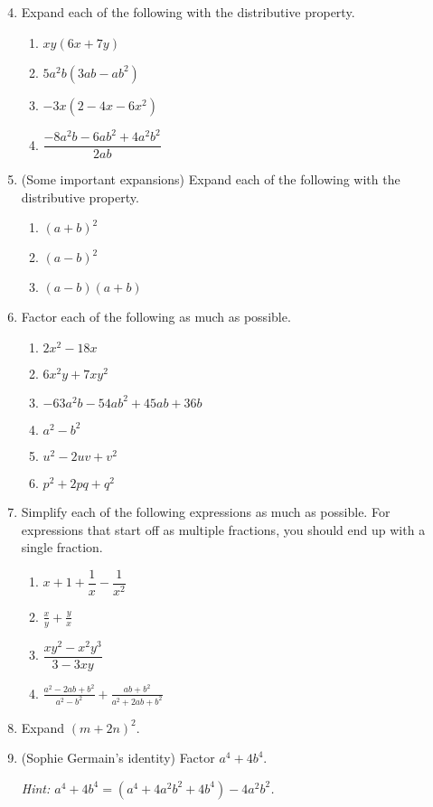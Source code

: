\documentclass{article}
\begin{document}
\begin{enumerate}
\setcounter{enumi}{3}
\item Expand each of the following with the distributive property.
\begin{enumerate}
\item $xy(6x + 7y)$
\item $5a^2b(3ab - ab^2)$
\item $-3x(2 - 4x - 6x^2)$
\item $\dfrac{-8a^2b - 6ab^2 + 4a^2b^2}{2ab}$
\end{enumerate}
\item (Some important expansions) Expand each of the following with the distributive property.
\begin{enumerate}
\item $(a + b)^2$
\item $(a - b)^2$
\item $(a - b)(a + b)$
\end{enumerate}
\item Factor each of the following as much as possible.
\begin{enumerate}
\item $2x^2 - 18x$
\item $6x^2y + 7xy^2$
\item $-63a^2b - 54ab^2 + 45ab + 36b$
\item $a^2 - b^2$
\item $u^2 - 2uv + v^2$
\item $p^2 + 2pq + q^2$
\end{enumerate}
\item Simplify each of the following expressions as much as possible. For expressions that start off as multiple fractions, you should end up with a single fraction.
\begin{enumerate}
\item $x + 1 + \dfrac{1}{x} - \dfrac{1}{x^2}$
\item $\displaystyle\frac{x}{y} + \frac{y}{x}$
\item $\dfrac{xy^2 - x^2y^3}{3 - 3xy}$
\item $\displaystyle\frac{a^2 - 2ab + b^2}{a^2 - b^2} + \frac{ab + b^2}{a^2 + 2ab + b^2}$
\end{enumerate}
\item Expand $(m + 2n)^2$.
\item (Sophie Germain's identity) Factor $a^4 + 4b^4$.\par\textit{Hint: $a^4 + 4b^4 = (a^4 + 4a^2b^2 + 4b^4) - 4a^2b^2$.}
\end{enumerate}
\end{document}
